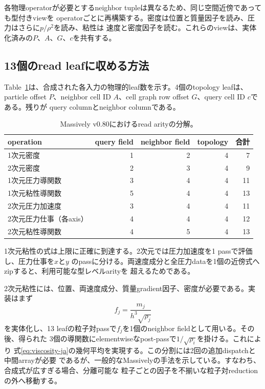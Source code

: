 \documentclass[a4paper,10pt]{ltjsarticle}
\begin{document}
各物理operatorが必要とするneighbor tupleは異なるため、同じ空間近傍であっても型付きviewを
operatorごとに再構築する。密度は位置と質量因子を読み、圧力はさらに$p/\rho^2$を読み、粘性は
速度と密度因子を読む。これらのviewは、実体化済みの$P$、$A$、$G$、$c$を共有する。

\subsection{13個のread leafに収める方法}

Table~\ref{tab:arity-ja}は、合成された各入力の物理的leaf数を示す。4個のtopology leafは、particle
offset $P$、neighbor cell ID $A$、cell graph row offset $G$、query cell ID $c$である。残りが
query columnとneighbor columnである。

\begin{table}[ht]
  \centering
  \caption{Massively v0.80におけるread arityの分解。}
  \label{tab:arity-ja}
  \begin{tabular}{lrrrr}
    \toprule
    operation & query field & neighbor field & topology & 合計 \\
    \midrule
    1次元密度                  & 1 & 2 & 4 & 7 \\
    2次元密度                  & 2 & 3 & 4 & 9 \\
    1次元圧力導関数            & 3 & 4 & 4 & 11 \\
    1次元粘性導関数            & 5 & 4 & 4 & 13 \\
    2次元圧力加速度            & 3 & 4 & 4 & 11 \\
    2次元圧力仕事（各axis）    & 4 & 4 & 4 & 12 \\
    2次元粘性導関数            & 4 & 5 & 4 & 13 \\
    \bottomrule
  \end{tabular}
\end{table}

1次元粘性の式は上限に正確に到達する。2次元では圧力加速度を1 passで評価し、圧力仕事を$x$と$y$
のpassに分ける。両速度成分と全圧力dataを1個の近傍式へzipすると、利用可能な型レベルarityを
超えるためである。

2次元粘性には、位置、両速度成分、質量gradient因子、密度が必要である。実装はまず
\begin{equation}
 f_j=\frac{m_j}{h^3\sqrt{\rho_j}}
\end{equation}
を実体化し、13 leafの粒子対passで$f_j$を1個のneighbor fieldとして用いる。その後、得られた
3個の導関数にelementwiseなpost-passで$1/\sqrt{\rho_i}$を掛ける。これにより
式\eqref{eq:viscosity-ja}の幾何平均を実現する。この分割には2回の追加dispatchと中間arrayが必要
であるが、一般的なMassivelyの手法を示している。すなわち、合成式が広すぎる場合、分離可能な
粒子ごとの因子を不揃いな粒子対reductionの外へ移動する。
\end{document}
